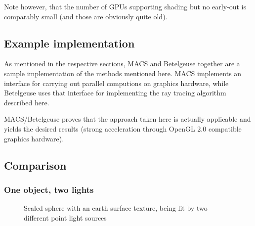 \documentclass[english,fleqn,10pt,twocolumn]{article}
\begin{document}
Note however, that the number of GPUs supporting shading but no early-out is comparably small (and those are obviously quite old).

\subsection{Example implementation}

As mentioned in the respective sections, MACS and Betelgeuse together are a sample implementation of the methods mentioned here. MACS implements an interface for carrying out parallel computions on graphics hardware, while Betelgeuse
uses that interface for implementing the ray tracing algorithm described here.

MACS/Betelgeuse proves that the approach taken here is actually applicable and yields the desired results (strong acceleration through OpenGL 2.0 compatible graphics hardware).

\subsection{Comparison}

\subsubsection{One object, two lights}

\begin{figure}[!ht]
    \centering {}
    \caption{Scaled sphere with an earth surface texture, being lit by two different point light sources}
\end{figure}
\end{document}
